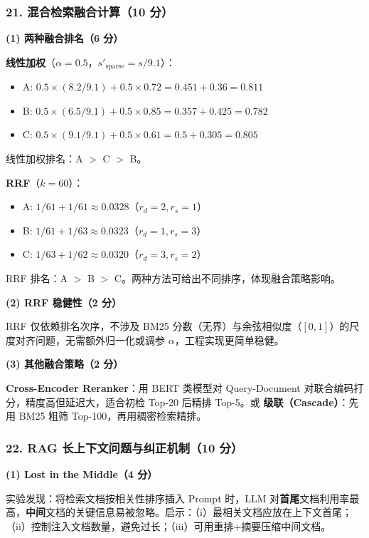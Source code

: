 \documentclass[11pt,a4paper]{article}
\begin{document}
\subsubsection*{21. 混合检索融合计算（10 分）}

\noindent\textbf{(1) 两种融合排名（6 分）}

\textbf{线性加权}（$\alpha=0.5$，$s'_{\mathrm{sparse}}=s/9.1$）：
\begin{itemize}[leftmargin=2em,itemsep=0pt,parsep=0pt,topsep=0pt]
  \item A: $0.5\times(8.2/9.1)+0.5\times0.72=0.451+0.36=0.811$
  \item B: $0.5\times(6.5/9.1)+0.5\times0.85=0.357+0.425=0.782$
  \item C: $0.5\times(9.1/9.1)+0.5\times0.61=0.5+0.305=0.805$
\end{itemize}
线性加权排名：A $>$ C $>$ B。

\textbf{RRF}（$k=60$）：
\begin{itemize}[leftmargin=2em,itemsep=0pt,parsep=0pt,topsep=0pt]
  \item A: $1/61+1/61\approx0.0328$（$r_d=2,r_s=1$）
  \item B: $1/61+1/63\approx0.0323$（$r_d=1,r_s=3$）
  \item C: $1/63+1/62\approx0.0320$（$r_d=3,r_s=2$）
\end{itemize}
RRF 排名：A $>$ B $>$ C。两种方法可给出不同排序，体现融合策略影响。

\noindent\textbf{(2) RRF 稳健性（2 分）}

RRF 仅依赖排名次序，不涉及 BM25 分数（无界）与余弦相似度（$[0,1]$）的尺度对齐问题，无需额外归一化或调参 $\alpha$，工程实现更简单稳健。

\noindent\textbf{(3) 其他融合策略（2 分）}

\textbf{Cross-Encoder Reranker}：用 BERT 类模型对 Query-Document 对联合编码打分，精度高但延迟大，适合初检 Top-20 后精排 Top-5。或 \textbf{级联（Cascade）}：先用 BM25 粗筛 Top-100，再用稠密检索精排。

\subsubsection*{22. RAG 长上下文问题与纠正机制（10 分）}

\noindent\textbf{(1) Lost in the Middle（4 分）}

实验发现：将检索文档按相关性排序插入 Prompt 时，LLM 对\textbf{首尾}文档利用率最高，\textbf{中间}文档的关键信息易被忽略。启示：（i）最相关文档应放在上下文首尾；（ii）控制注入文档数量，避免过长；（iii）可用重排+摘要压缩中间文档。
\end{document}

